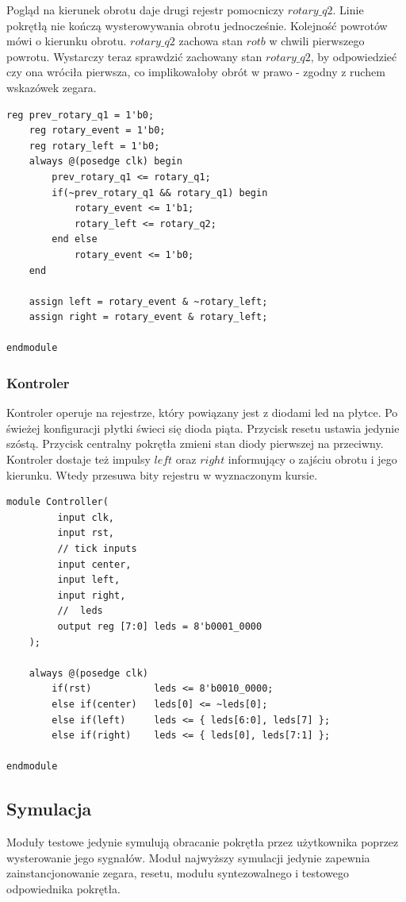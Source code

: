\documentclass[a4paper,12pt]{article}
\begin{document}
Pogląd na kierunek obrotu daje drugi rejestr pomocniczy $rotary\_q2$. Linie pokrętłą nie kończą wysterowywania obrotu jednocześnie. Kolejność powrotów mówi o kierunku obrotu. $rotary\_q2$ zachowa stan $rotb$ w chwili pierwszego powrotu. Wystarczy teraz sprawdzić zachowany stan $rotary\_q2$, by odpowiedzieć czy ona wróciła pierwsza, co implikowałoby obrót w prawo - zgodny z ruchem wskazówek zegara.
\begin{lstlisting}[label=Rotor,caption=Rotor.v,firstnumber=22]
    reg prev_rotary_q1 = 1'b0;
    reg rotary_event = 1'b0;
    reg rotary_left = 1'b0;
    always @(posedge clk) begin
        prev_rotary_q1 <= rotary_q1;
        if(~prev_rotary_q1 && rotary_q1) begin
            rotary_event <= 1'b1;
            rotary_left <= rotary_q2;
        end else
            rotary_event <= 1'b0;
    end

    assign left = rotary_event & ~rotary_left;
    assign right = rotary_event & rotary_left;

endmodule
\end{lstlisting}

\subsubsection{Kontroler}

Kontroler operuje na rejestrze, który powiązany jest z diodami led na płytce. Po świeżej konfiguracji płytki świeci się dioda piąta. Przycisk resetu ustawia jedynie szóstą. Przycisk centralny pokrętła zmieni stan diody pierwszej na przeciwny. Kontroler dostaje też impulsy $left$ oraz $right$ informujący o zajściu obrotu i jego kierunku. Wtedy przesuwa bity rejestru w wyznaczonym kursie.
\begin{lstlisting}[label=Controller,caption=Controller.v]
module Controller(
         input clk,
         input rst,
         // tick inputs
         input center,
         input left,
         input right,
         //  leds
         output reg [7:0] leds = 8'b0001_0000
    );

    always @(posedge clk)
        if(rst)           leds <= 8'b0010_0000;
        else if(center)   leds[0] <= ~leds[0];
        else if(left)     leds <= { leds[6:0], leds[7] };
        else if(right)    leds <= { leds[0], leds[7:1] };

endmodule
\end{lstlisting}

\subsection{Symulacja}
Moduły testowe jedynie symulują obracanie pokrętła przez użytkownika poprzez wysterowanie jego sygnałów. Moduł najwyższy symulacji jedynie zapewnia zainstancjonowanie zegara, resetu, modułu syntezowalnego i testowego odpowiednika pokrętła.
\end{document}
